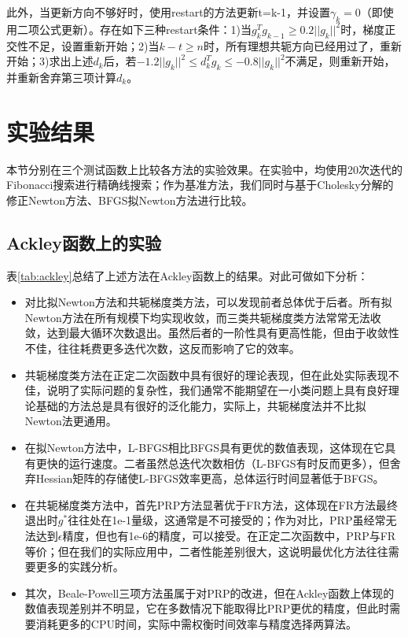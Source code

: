 \documentclass{article}
\begin{document}
此外，当更新方向不够好时，使用restart的方法更新t=k-1，并设置$\gamma_k=0$（即使用二项公式更新）。存在如下三种restart条件：1)当$g_k^T g_{k-1} \geq 0.2 ||g_k||^2$时，梯度正交性不足，设置重新开始；2)当$k-t\geq n$时，所有理想共轭方向已经用过了，重新开始；3)求出上述$d_k$后，若$-1.2||g_k||^2\leq d_k^T g_k\leq -0.8||g_k||^2$不满足，则重新开始，并重新舍弃第三项计算$d_k$。


\section{实验结果}
本节分别在三个测试函数上比较各方法的实验效果。在实验中，均使用20次迭代的Fibonacci搜索进行精确线搜索；作为基准方法，我们同时与基于Cholesky分解的修正Newton方法、BFGS拟Newton方法进行比较。

\subsection{Ackley函数上的实验}
表\ref{tab:ackley}总结了上述方法在Ackley函数上的结果。对此可做如下分析：
\begin{itemize}
  \item 对比拟Newton方法和共轭梯度类方法，可以发现前者总体优于后者。所有拟Newton方法在所有规模下均实现收敛，而三类共轭梯度类方法常常无法收敛，达到最大循环次数退出。虽然后者的一阶性具有更高性能，但由于收敛性不佳，往往耗费更多迭代次数，这反而影响了它的效率。
  \item 共轭梯度类方法在正定二次函数中具有很好的理论表现，但在此处实际表现不佳，说明了实际问题的复杂性，我们通常不能期望在一小类问题上具有良好理论基础的方法总是具有很好的泛化能力，实际上，共轭梯度法并不比拟Newton法更通用。
  \item 在拟Newton方法中，L-BFGS相比BFGS具有更优的数值表现，这体现在它具有更快的运行速度。二者虽然总迭代次数相仿（L-BFGS有时反而更多），但舍弃Hessian矩阵的存储使L-BFGS效率更高，总体运行时间显著低于BFGS。
  \item 在共轭梯度类方法中，首先PRP方法显著优于FR方法，这体现在FR方法最终退出时$g^*$往往处在1e-1量级，这通常是不可接受的；作为对比，PRP虽经常无法达到$\epsilon$精度，但也有1e-6的精度，可以接受。在正定二次函数中，PRP与FR等价；但在我们的实际应用中，二者性能差别很大，这说明最优化方法往往需要更多的实践分析。
  \item 其次，Beale-Powell三项方法虽属于对PRP的改进，但在Ackley函数上体现的数值表现差别并不明显，它在多数情况下能取得比PRP更优的精度，但此时需要消耗更多的CPU时间，实际中需权衡时间效率与精度选择两算法。
\end{itemize}
\end{document}
